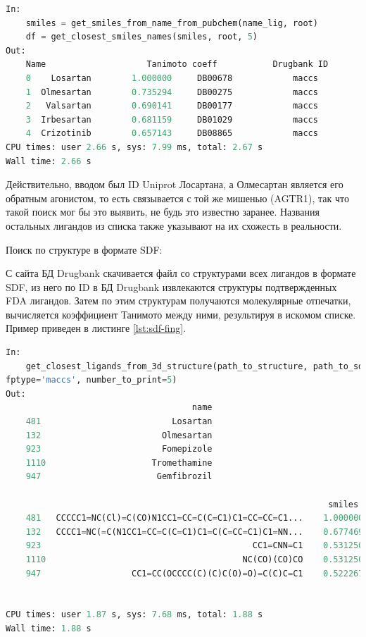 \documentclass[a4paper,14pt]{article}         %
\begin{document}
\begin{lstlisting}[language=Python, label={lst:smiles-fing}, caption={Сходство лигандов по текстовым молекулярным отпечаткам с помощью ПМ RDkit для входных данных~--- SMILES структуры молекулы.}]
In:
	smiles = get_smiles_from_name_from_pubchem(name_lig, root)
	df = get_closest_smiles_names(smiles, root, 5)
Out:
	Name  					Tanimoto coeff			 Drugbank ID 		Fingerprint type
	0    Losartan        1.000000     DB00678            maccs
	1  Olmesartan        0.735294     DB00275            maccs
	2   Valsartan        0.690141     DB00177            maccs
	3  Irbesartan        0.681159     DB01029            maccs
	4  Crizotinib        0.657143     DB08865            maccs
CPU times: user 2.66 s, sys: 7.99 ms, total: 2.67 s
Wall time: 2.66 s
\end{lstlisting}

Действительно, вводом был ID Uniprot Лосартана, а Олмесартан является его обратным агонистом, то есть связывается с той же мишенью (AGTR1), так что такой поиск мог бы это выявить, не будь это известно заранее. Названия остальных лигандов из списка также указывают на их схожесть в реальности.

Поиск по структуре в формате SDF:

С сайта БД Drugbank скачивается файл со структурами всех лигандов в формате SDF, из него по ID в БД Drugbank извлекаются структуры подтвержденных FDA лигандов. Затем по этим структурам получаются молекулярные отпечатки, вычисляется коэффициент Танимото между ними, результируя в искомом списке. Пример приведен в листинге \ref{lst:sdf-fing}.

\begin{lstlisting}[language=Python, label={lst:sdf-fing}, caption={Сходство лигандов по топологическим молекулярным отпечаткам с помощью ПМ Open Babel для входных данных~--- SDF структуры молекулы.}]
In: 
	get_closest_ligands_from_3d_structure(path_to_structure, path_to_sdf_approved, root,
fptype='maccs', number_to_print=5)
Out:
	                                 name  
	481                          Losartan  
	132                        Olmesartan  
	923                        Fomepizole  
	1110                     Tromethamine  
	947                       Gemfibrozil  
	
																smiles  													similarity  \
	481   CCCCC1=NC(Cl)=C(CO)N1CC1=CC=C(C=C1)C1=CC=CC=C1...    1.000000   
	132   CCCC1=NC(=C(N1CC1=CC=C(C=C1)C1=C(C=CC=C1)C1=NN...    0.677469   
	923                                          CC1=CNN=C1    0.531250   
	1110                                       NC(CO)(CO)CO    0.531250   
	947                  CC1=CC(OCCCC(C)(C)C(O)=O)=C(C)C=C1    0.522267 
 

CPU times: user 1.87 s, sys: 7.68 ms, total: 1.88 s
Wall time: 1.88 s
\end{lstlisting}
\end{document}
